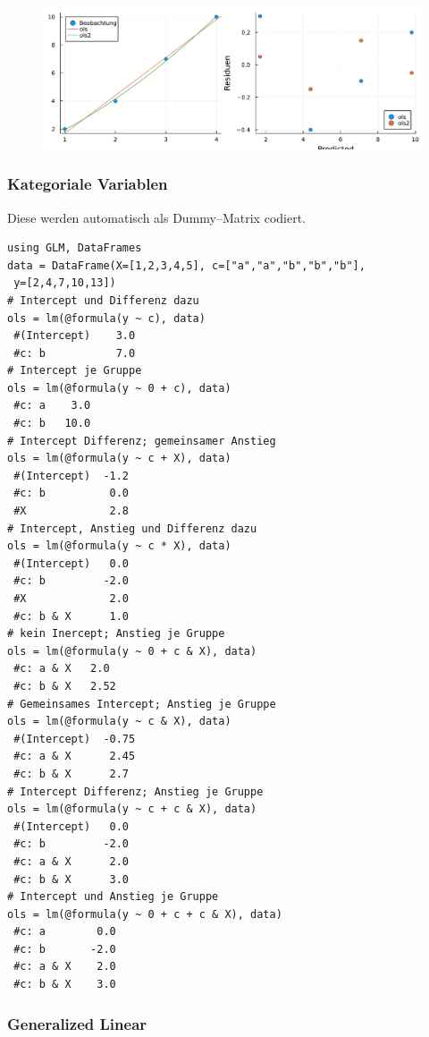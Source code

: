 \documentclass[10pt,twocolumn]{scrartcl}
\begin{document}
\begin{figure}[h]
  \centering
  \includegraphics[width=.95\columnwidth]{glm.pdf}
\end{figure}

\subsubsection{Kategoriale Variablen}
\label{ssec:kategorialeVariablen}

Diese werden automatisch als Dummy--Matrix codiert.

\begin{lstlisting}
using GLM, DataFrames
data = DataFrame(X=[1,2,3,4,5], c=["a","a","b","b","b"],
 y=[2,4,7,10,13])
# Intercept und Differenz dazu
ols = lm(@formula(y ~ c), data)
 #(Intercept)    3.0
 #c: b           7.0
# Intercept je Gruppe
ols = lm(@formula(y ~ 0 + c), data)
 #c: a    3.0
 #c: b   10.0
# Intercept Differenz; gemeinsamer Anstieg
ols = lm(@formula(y ~ c + X), data)
 #(Intercept)  -1.2
 #c: b          0.0
 #X             2.8
# Intercept, Anstieg und Differenz dazu
ols = lm(@formula(y ~ c * X), data)
 #(Intercept)   0.0
 #c: b         -2.0
 #X             2.0
 #c: b & X      1.0
# kein Inercept; Anstieg je Gruppe
ols = lm(@formula(y ~ 0 + c & X), data)
 #c: a & X   2.0
 #c: b & X   2.52
# Gemeinsames Intercept; Anstieg je Gruppe
ols = lm(@formula(y ~ c & X), data)
 #(Intercept)  -0.75
 #c: a & X      2.45
 #c: b & X      2.7
# Intercept Differenz; Anstieg je Gruppe
ols = lm(@formula(y ~ c + c & X), data)
 #(Intercept)   0.0
 #c: b         -2.0
 #c: a & X      2.0
 #c: b & X      3.0
# Intercept und Anstieg je Gruppe
ols = lm(@formula(y ~ 0 + c + c & X), data)
 #c: a        0.0
 #c: b       -2.0
 #c: a & X    2.0
 #c: b & X    3.0
\end{lstlisting}

\subsubsection{Generalized Linear}
\end{document}
